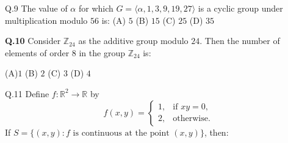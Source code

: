 \documentclass{article}
\begin{document}
																									Q.9 \quad The value of $\alpha$ for which $G = \langle \alpha, 1, 3, 9, 19, 27 \rangle$ is a cyclic group under multiplication modulo $56$ is:
																									\vspace{1em}
																									\newline 
																									\noindent (A) $5$ \hspace{2cm} (B) $15$ \hspace{2cm}(C) $25$ \hspace{2cm} (D) $35$



																									\vspace{1em}

																									\textbf{Q.10} \quad Consider $\mathbb{Z}_{24}$ as the additive group modulo $24$. Then the number of elements of order $8$ in the group $\mathbb{Z}_{24}$ is:

																									\vspace{1em}

																									\noindent  (A)$1$ \hspace{2cm} (B) $2$ \hspace{2cm}(C) $3$ \hspace{2cm} (D) $4$

																									\vspace{1em}


																									Q.11 \quad Define $f : \mathbb{R}^2 \to \mathbb{R}$ by
																									\[
																									f(x, y) =
																									\begin{cases}
																									1, & \text{if } xy = 0, \\
																									2, & \text{otherwise}.
																									\end{cases}
																									\]
																									If $S = \{(x, y) : f \text{ is continuous at the point } (x, y)\}$, then:
\end{document}
